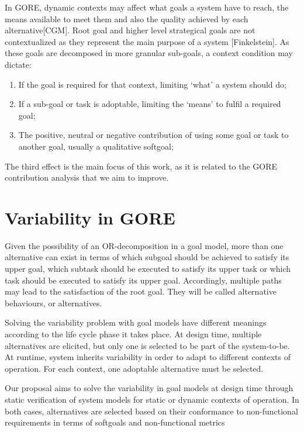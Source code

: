 In GORE, dynamic contexts may affect what goals a system have to reach, the means available to meet them and also the quality achieved by each alternative[CGM]. Root goal and higher level strategical goals are not contextualized as they represent the main purpose of a system [Finkelstein]. As these goals are decomposed in more granular sub-goals, a context condition may dictate:

\begin{enumerate}

\item If the goal is required for that context, limiting `what' a system should do;
\medskip

\item If a sub-goal or task is adoptable, limiting the `means' to fulfil a required goal;
\medskip

\item The positive, neutral or negative contribution of using some goal or task to another goal, usually a qualitative softgoal;

\end{enumerate}

The third effect is the main focus of this work, as it is related to the GORE contribution analysis that we aim to improve.

\section{Variability in GORE}\label{sec:variability}

Given the possibility of an OR-decomposition in a goal model, more than one alternative can exist in terms of which subgoal should be achieved to satisfy its upper goal,  which subtask should be executed to satisfy its upper task or which task should be executed to satisfy its upper goal. Accordingly, multiple paths may lead to the satisfaction of the root goal. They will be called alternative behaviours, or alternatives. 

Solving the variability problem with goal models have different meanings according to the life cycle phase it takes place. At design time, multiple alternatives are elicited, but only one is selected to be part of the system-to-be. At runtime, system inherits variability in order to adapt to different contexts of operation. For each context, one adoptable alternative must be selected. 

Our proposal aims to solve the variability in goal models at design time through static verification of system models for static or dynamic contexts of operation. In both cases, alternatives are selected based on their conformance to non-functional requirements in terms of softgoals and non-functional metrics

